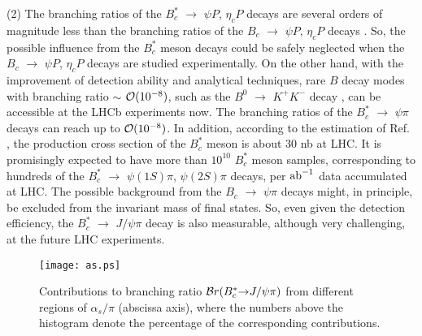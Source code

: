 \documentclass[preprint,superscriptaddress,nofootinbib]{revtex4}
\begin{document}
  (2)
  The branching ratios of the $B_{c}^{\ast}$ ${\to}$ ${\psi}P$, ${\eta}_{c}P$
  decays are several orders of magnitude less than the branching ratios of
  the $B_{c}$ ${\to}$ ${\psi}P$, ${\eta}_{c}P$ decays \cite{epjc60.107,prd77.074013}.
  So, the possible influence from the $B_{c}^{\ast}$ meson decays could be
  safely neglected when the $B_{c}$ ${\to}$ ${\psi}P$, ${\eta}_{c}P$ decays
  are studied experimentally.
  On the other hand, with the improvement of detection ability and analytical
  techniques, rare $B$ decay modes with branching ratio ${\sim}$ ${\cal O}(10^{-8})$,
  such as the $B^{0}$ ${\to}$ $K^{+}K^{-}$ decay \cite{1610.08288},
  can be accessible at the LHCb experiments now.
  The branching ratios of the $B_{c}^{\ast}$ ${\to}$ ${\psi}{\pi}$
  decays can reach up to ${\cal O}(10^{-8})$.
  In addition, according to the estimation of Ref. \cite{prd72.114009},
  the production cross section of the $B_{c}^{\ast}$ meson is about 30 nb
  at LHC. It is promisingly expected to have more than
  $10^{10}$ $B_{c}^{\ast}$ meson samples, corresponding to hundreds of the
  $B_{c}^{\ast}$ ${\to}$ ${\psi}(1S){\pi}$, ${\psi}(2S){\pi}$ decays, per
  ${\rm ab}^{-1}$ data accumulated at LHC.
  The possible background from the $B_{c}$ ${\to}$ ${\psi}{\pi}$ decays might,
  in principle, be excluded from the invariant mass of final states.
  So, even given the detection efficiency, the $B_{c}^{\ast}$ ${\to}$ $J/{\psi}{\pi}$
  decay is also measurable, although very challenging, at the future LHC experiments.

  \begin{figure}[h]
  \texttt{[image: as.ps]}
  \caption{Contributions to branching ratio
  ${\cal B}r(B_{c}^{\ast}{\to}J/{\psi}{\pi})$ from different regions of
  ${\alpha}_{s}/{\pi}$ (abscissa axis), where the numbers above the histogram
  denote the percentage of the corresponding contributions.}
  \label{fig:as}
  \end{figure}
\end{document}
